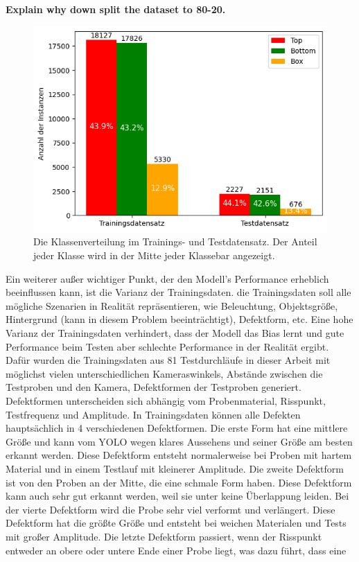     \textbf{Explain why down split the dataset to 80-20.}
    
    \begin{figure}[htbp]
        \centering
        \includegraphics[width=0.7\linewidth, height=0.5\textwidth]{gfx/Detector/Dataset/Datensatz.png}

        \caption[Die Verteilung der Klassen in Trainings- und Testdatensatz]{Die Klassenverteilung im Trainings- und Testdatensatz. Der Anteil jeder Klasse wird in der Mitte jeder Klassebar angezeigt.}
        \label{fig:methodik:Datensatz}
    \end{figure}

    Ein weiterer außer wichtiger Punkt, der den Modell's Performance erheblich beeinflussen kann, ist die Varianz der Trainingsdaten. die Trainingsdaten soll alle mögliche Szenarien in Realität repräsentieren, wie Beleuchtung, Objektsgröße, Hintergrund (kann in diesem Problem beeinträchtigt), Defektform, etc. Eine hohe Varianz der Trainingsdaten verhindert, dass der Modell das Bias lernt und gute Performance beim Testen aber schlechte Performance in der Realität ergibt. Dafür wurden die Trainingsdaten aus 81 Testdurchläufe in dieser Arbeit mit möglichst vielen unterschiedlichen Kameraswinkels, Abstände zwischen die Testproben und den Kamera, Defektformen der Testproben generiert. Defektformen unterscheiden sich abhängig vom Probenmaterial, Risspunkt, Testfrequenz und Amplitude. In Trainingsdaten können alle Defekten hauptsächlich in 4 verschiedenen Defektformen. Die erste Form hat eine mittlere Größe und kann vom YOLO wegen klares Aussehens und seiner Größe am besten erkannt werden. Diese Defektform entsteht normalerweise bei Proben mit hartem Material und in einem Testlauf mit kleinerer Amplitude. Die zweite Defektform ist von den Proben an der Mitte, die eine schmale Form haben. Diese Defektform kann auch sehr gut erkannt werden, weil sie unter keine Überlappung leiden. Bei der vierte Defektform wird die Probe sehr viel verformt und verlängert. Diese Defektform  hat die größte Größe und entsteht bei weichen Materialen und Tests mit großer Amplitude. Die letzte Defektform passiert, wenn der Risspunkt entweder an obere oder untere Ende einer Probe liegt, was dazu führt, dass eine   

